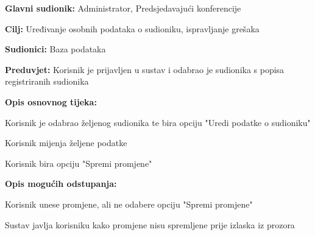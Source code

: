 					\noindent {}
					\begin{packed_item}
						\item \textbf{Glavni sudionik:} Administrator, Predsjedavajući konferencije
						\item \textbf{Cilj:} Uređivanje osobnih podataka o sudioniku, ispravljanje grešaka
						\item \textbf{Sudionici:} Baza podataka
						\item \textbf{Preduvjet:} Korisnik je prijavljen u sustav i odabrao je sudionika s popisa registriranih sudionika
						
						\item \textbf{Opis osnovnog tijeka:} 
						\item[] \begin{packed_enum}
							
							\item Korisnik je odabrao željenog sudionika te bira opciju "Uredi podatke o sudioniku"
							\item Korisnik mijenja željene podatke
							\item Korisnik bira opciju "Spremi promjene"
						\end{packed_enum}
						
						\item \textbf{Opis mogućih odstupanja:}
						\item[] \begin{packed_enum}
							
							\item[3.a] Korisnik unese promjene, ali ne odabere opciju "Spremi promjene"
							\item[] \begin{packed_enum}
								\item[1.] Sustav javlja korisniku kako promjene nisu spremljene prije izlaska iz prozora
							\end{packed_enum}
						\end{packed_enum}
					\end{packed_item}
					
